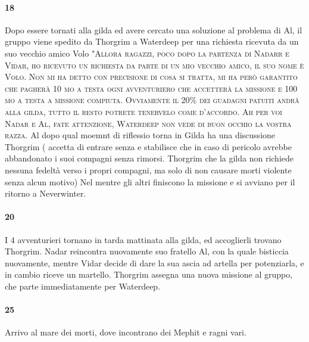 \documentclass{article}
\begin{document}
                  \paragraph{18}

 Dopo essere tornati alla gilda ed avere cercato una soluzione al problema di Al, il gruppo viene spedito da Thorgrim a Waterdeep per una richiesta ricevuta da un suo vecchio amico Volo "\textsc{Allora ragazzi, poco dopo la partenza di Nadarr e Vidar, ho ricevuto un richiesta da parte di un mio vecchio amico, il suo nome è Volo. Non mi ha detto con precisione di cosa si tratta, mi ha però garantito che pagherà 10 mo a testa ogni avventuriero che accetterà la missione e 100 mo a testa a missione compiuta. Ovviamente il 20\% dei guadagni patuiti andrà alla gilda, tutto il resto potrete tenervelo come d'accordo. Ah per voi Nadar e Al, fate attenzione,  Waterdeep non vede di buon occhio la vostra razza}.  Al dopo qual moemnt di riflessio torna in Gilda ha una discussione Thorgrim ( accetta di entrare senza e stabilisce che in caso di pericolo avrebbe abbandonato i suoi compagni senza rimorsi. Thorgrim che la gilda non richiede nessuna fedeltà verso i propri compagni, ma solo di non causare morti violente senza alcun motivo) 
   Nel mentre gli altri finiscono la missione e si avviano per il ritorno a Neverwinter. 
                  \paragraph{20}
I 4 avventurieri tornano in tarda mattinata alla gilda, ed accoglierli trovano Thorgrim. Nadar reincontra nuovamente suo fratello Al, con la quale bisticcia nuovamente, mentre Vidar decide di dare la sua ascia ad artella per potenziarla, e in cambio riceve un martello. Thorgrim assegna una nuova missione al gruppo, che parte immediatamente per Waterdeep. 
                  \paragraph{25} Arrivo al mare dei morti, dove incontrano dei Mephit e ragni vari. 
\end{document}
